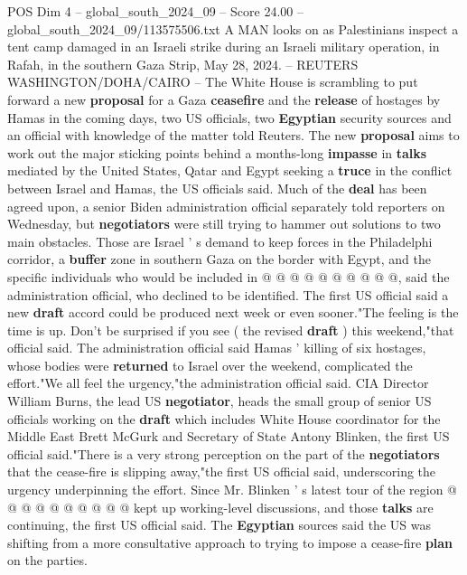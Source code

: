 \begin{textsample}{POS Dim 4 – global\_south\_2024\_09 – Score 24.00 – global\_south\_2024\_09/113575506.txt}  \label{ex:f4_pos_292}
A MAN looks on as Palestinians inspect a tent camp damaged in an Israeli strike during an Israeli military operation, in Rafah, in the southern Gaza Strip, May 28, 2024. -- REUTERS WASHINGTON/DOHA/CAIRO -- The White House is scrambling to put forward a new \textbf{proposal} for a Gaza \textbf{ceasefire} and the \textbf{release} of hostages by Hamas in the coming days, two US officials, two \textbf{Egyptian} security sources and an official with knowledge of the matter told Reuters.
The new \textbf{proposal} aims to work out the major sticking points behind a months-long \textbf{impasse} in \textbf{talks} mediated by the United States, Qatar and Egypt seeking a \textbf{truce} in the conflict between Israel and Hamas, the US officials said.
Much of the \textbf{deal} has been agreed upon, a senior Biden administration official separately told reporters on Wednesday, but \textbf{negotiators} were still trying to hammer out solutions to two main obstacles.
Those are Israel ' s demand to keep forces in the Philadelphi corridor, a \textbf{buffer} zone in southern Gaza on the border with Egypt, and the specific individuals who would be included in @ @ @ @ @ @ @ @ @ @, said the administration official, who declined to be identified.
The first US official said a new \textbf{draft} accord could be produced next week or even sooner."The feeling is the time is up.
Don't be surprised if you see ( the revised \textbf{draft} ) this weekend,"that official said.
The administration official said Hamas ' killing of six hostages, whose bodies were \textbf{returned} to Israel over the weekend, complicated the effort."We all feel the urgency,"the administration official said.
CIA Director William Burns, the lead US \textbf{negotiator}, heads the small group of senior US officials working on the \textbf{draft} which includes White House coordinator for the Middle East Brett McGurk and Secretary of State Antony Blinken, the first US official said."There is a very strong perception on the part of the \textbf{negotiators} that the cease-fire is slipping away,"the first US official said, underscoring the urgency underpinning the effort.
Since Mr.
Blinken ' s latest tour of the region @ @ @ @ @ @ @ @ @ @ kept up working-level discussions, and those \textbf{talks} are continuing, the first US official said.
The \textbf{Egyptian} sources said the US was shifting from a more consultative approach to trying to impose a cease-fire \textbf{plan} on the parties.

\end{textsample}
